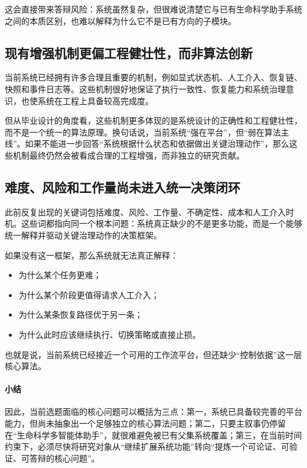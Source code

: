 这会直接带来答辩风险：系统虽然复杂，但很难说清楚它与已有生命科学助手系统之间的本质区别，也难以解释为什么它不是已有方向的子模块。

\subsection{现有增强机制更偏工程健壮性，而非算法创新}

当前系统已经拥有许多合理且重要的机制，例如显式状态机、人工介入、恢复链、快照和事件日志等。这些机制很好地保证了执行一致性、恢复能力和系统治理意识，也使系统在工程上具备较高完成度。

但从毕业设计的角度看，这些机制更多体现的是系统设计的正确性和工程健壮性，而不是一个统一的算法原理。换句话说，当前系统“强在平台”，但“弱在算法主线”。如果不能进一步回答“系统根据什么状态和依据做出关键治理动作”，那么这些机制最终仍然会被看成合理的工程增强，而非独立的研究贡献。

\subsection{难度、风险和工作量尚未进入统一决策闭环}

此前反复出现的关键词包括难度、风险、工作量、不确定性、成本和人工介入时机。这些词都指向同一个根本问题：系统真正缺少的不是更多功能，而是一个能够统一解释并驱动关键治理动作的决策框架。

如果没有这一框架，那么系统就无法真正解释：
\begin{itemize}
	\item 为什么某个任务更难；
	\item 为什么某个阶段更值得请求人工介入；
	\item 为什么某条恢复路径优于另一条；
	\item 为什么此时应该继续执行、切换策略或直接止损。
\end{itemize}

也就是说，当前系统已经接近一个可用的工作流平台，但还缺少“控制依据”这一层核心算法。

\paragraph{小结}
因此，当前选题面临的核心问题可以概括为三点：第一，系统已具备较完善的平台能力，但尚未抽象出一个足够独立的核心算法问题；第二，只要主叙事仍停留在“生命科学多智能体助手”，就很难避免被已有父集系统覆盖；第三，在当前时间约束下，必须尽快将研究对象从“继续扩展系统功能”转向“提炼一个可论证、可验证、可答辩的核心问题”。
